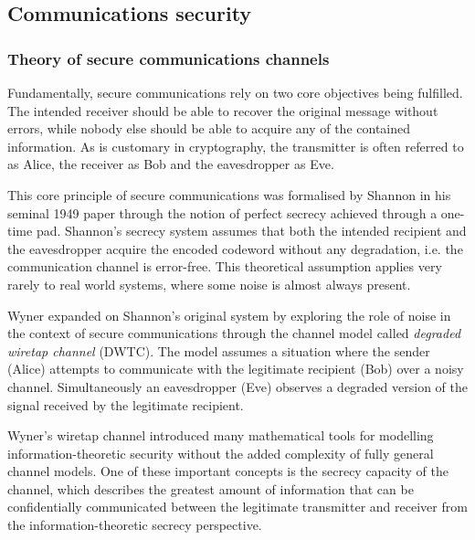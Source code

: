 \documentclass[english, 12pt, a4paper, elec, utf8, a-1b, online]{aaltothesis}
\begin{document}


\subsection{Communications security}
\subsubsection{Theory of secure communications channels}
Fundamentally, secure communications rely on two core objectives being fulfilled.
The intended receiver should be able to recover the original message without errors, while nobody else should be able to acquire any of the contained information.
As is customary in cryptography, the transmitter is often referred to as Alice, the receiver as Bob and the eavesdropper as Eve.
\cite{bloch2011physical}

This core principle of secure communications was formalised by Shannon \cite{shannon1949communication} in his seminal 1949 paper through the notion of perfect secrecy achieved through a one-time pad.
Shannon's secrecy system assumes that both the intended recipient and the eavesdropper acquire the encoded codeword without any degradation, i.e. the communication channel is error-free.
This theoretical assumption applies very rarely to real world systems, where some noise is almost always present.
\cite{bloch2011physical}

Wyner \cite{wyner1975thewiretap} expanded on Shannon's original system by exploring the role of noise in the context of secure communications through the channel model called \textit{degraded wiretap channel} (DWTC).
The model assumes a situation where the sender (Alice) attempts to communicate with the legitimate recipient (Bob) over a noisy channel.
Simultaneously an eavesdropper (Eve) observes a degraded version of the signal received by the legitimate recipient.
\cite{barros2006secrecy}

Wyner's wiretap channel introduced many mathematical tools for modelling information-theoretic security without the added complexity of fully general channel models.
One of these important concepts is the secrecy capacity of the channel, which describes the greatest amount of information that can be confidentially communicated between the legitimate transmitter and receiver from the information-theoretic secrecy perspective.
\cite{bloch2011physical}
\end{document}
